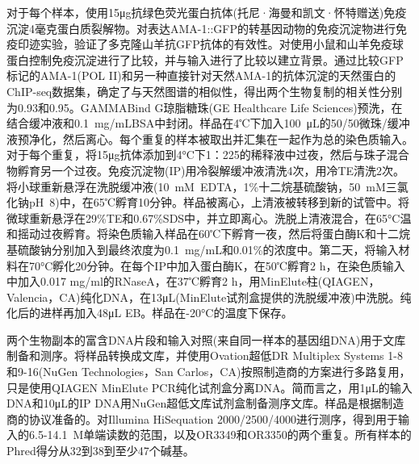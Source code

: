 \documentclass{ctexart}
\begin{document}
    对于每个样本，使用15μg抗绿色荧光蛋白抗体(托尼·海曼和凯文·怀特赠送)免疫沉淀4毫克蛋白质裂解物。对表达AMA-1::GFP的转基因动物的免疫沉淀物进行免疫印迹实验，验证了多克隆山羊抗GFP抗体的有效性。对使用小鼠和山羊免疫球蛋白控制免疫沉淀进行了比较，并与输入进行了比较以建立背景。通过比较GFP标记的AMA-1(POL II)和另一种直接针对天然AMA-1的抗体沉淀的天然蛋白的ChIP-seq数据集，确定了与天然图谱的相似性，得出两个生物复制的相关性分别为0.93和0.95。GAMMABind G琼脂糖珠(GE Healthcare Life Sciences)预洗，在结合缓冲液和0.1~mg/mLBSA中封闭。样品在4℃下加入100~μL的50/50微珠/缓冲液预净化，然后离心。每个重复的样本被取出并汇集在一起作为总的染色质输入。对于每个重复，将15μg抗体添加到4°C下1：225的稀释液中过夜，然后与珠子混合物孵育另一个过夜。免疫沉淀物(IP)用冷裂解缓冲液清洗4次，用冷TE清洗2次。将小球重新悬浮在洗脱缓冲液(10~mM~EDTA，1\%十二烷基硫酸钠，50~mM三氯化钠pH~8)中，在65℃孵育10分钟。样品被离心，上清液被转移到新的试管中。将微球重新悬浮在29\%TE和0.67\%SDS中，并立即离心。洗脱上清液混合，在65°C温和摇动过夜孵育。将染色质输入样品在60℃下孵育一夜，然后将蛋白酶K和十二烷基硫酸钠分别加入到最终浓度为0.1~mg/mL和0.01\%的浓度中。第二天，将输入材料在70°C孵化20分钟。在每个IP中加入蛋白酶K，在50℃孵育2 h，在染色质输入中加入0.017 mg/ml的RNaseA，在37℃孵育2 h，用MinElute柱(QIAGEN，Valencia，CA)纯化DNA，在13μL(MinElute试剂盒提供的洗脱缓冲液)中洗脱。纯化后的进样再加入48μL EB。样品在-20°C的温度下保存。

    两个生物副本的富含DNA片段和输入对照(来自同一样本的基因组DNA)用于文库制备和测序。将样品转换成文库，并使用Ovation超低DR Multiplex Systems 1-8和9-16(NuGen Technologies，San Carlos，CA)按照制造商的方案进行多路复用，只是使用QIAGEN MinElute PCR纯化试剂盒分离DNA。简而言之，用1μL的输入DNA和10μL的IP DNA用NuGen超低文库试剂盒制备测序文库。样品是根据制造商的协议准备的。对Illumina HiSequation 2000/2500/4000进行测序，得到用于输入的6.5-14.1~M单端读数的范围，以及OR3349和OR3350的两个重复。所有样本的Phred得分从32到38到至少47个碱基。
\end{document}
